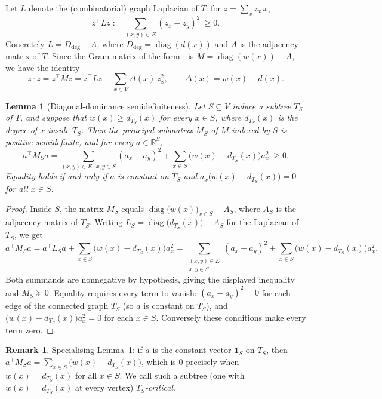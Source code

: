 \documentclass[11pt]{article}
\newcommand{\bR}{\mathbb{R}}
\newtheorem{lemma}{Lemma}
\theoremstyle{definition}
\newtheorem{remark}{Remark}
\begin{document}
Let $L$ denote the (combinatorial) graph Laplacian of $T$: for $z=\sum_x z_x\,x$,
\begin{equation}\label{eq:laplacian}
z^\top L z:=\sum_{(x,y)\in E}(z_x-z_y)^2\ \ge 0 .
\end{equation}
Concretely $L=D_{\deg}-A$, where $D_{\deg}=\operatorname{diag}(d(x))$ and $A$ is the
adjacency matrix of $T$. Since the Gram matrix of the form $\cdot$ is
$M=\operatorname{diag}(w(x))-A$, we have the identity
\begin{equation}\label{eq:Mdecomp}
z\cdot z=z^\top M z=z^\top L z+\sum_{x\in V}\Delta(x)\,z_x^2 ,
\qquad \Delta(x)=w(x)-d(x).
\end{equation}

\begin{lemma}[Diagonal-dominance semidefiniteness]\label{lem:psd}
Let $S\subseteq V$ induce a subtree $T_S$ of $T$, and suppose that
$w(x)\ge d_{T_S}(x)$ for every $x\in S$, where $d_{T_S}(x)$ is the degree of $x$
inside $T_S$. Then the principal submatrix $M_S$ of $M$ indexed by $S$ is positive
semidefinite, and for every $a\in\bR^{S}$,
\[
a^\top M_S a=\sum_{(x,y)\in E,\;x,y\in S}(a_x-a_y)^2+\sum_{x\in S}\bigl(w(x)-d_{T_S}(x)\bigr)a_x^2\ \ge 0 .
\]
Equality holds if and only if $a$ is constant on $T_S$ and $a_x\bigl(w(x)-d_{T_S}(x)\bigr)=0$ for all $x\in S$.
\end{lemma}

\begin{proof}
Inside $S$, the matrix $M_S$ equals $\operatorname{diag}\bigl(w(x)\bigr)_{x\in S}-A_S$,
where $A_S$ is the adjacency matrix of $T_S$. Writing
$L_S=\operatorname{diag}\bigl(d_{T_S}(x)\bigr)-A_S$ for the Laplacian of $T_S$, we get
\[
a^\top M_S a=a^\top L_S a+\sum_{x\in S}\bigl(w(x)-d_{T_S}(x)\bigr)a_x^2
=\sum_{\substack{(x,y)\in E\\ x,y\in S}}(a_x-a_y)^2+\sum_{x\in S}\bigl(w(x)-d_{T_S}(x)\bigr)a_x^2 .
\]
Both summands are nonnegative by hypothesis, giving the displayed inequality and
$M_S\succeq 0$. Equality requires every term to vanish: $(a_x-a_y)^2=0$ for each edge
of the connected graph $T_S$ (so $a$ is constant on $T_S$), and
$\bigl(w(x)-d_{T_S}(x)\bigr)a_x^2=0$ for each $x\in S$. Conversely these conditions
make every term zero.
\end{proof}

\begin{remark}\label{rem:critical}
Specialising Lemma~\ref{lem:psd}: if $a$ is the constant vector $\mathbf 1_S$ on $T_S$,
then $a^\top M_S a=\sum_{x\in S}\bigl(w(x)-d_{T_S}(x)\bigr)$, which is $0$ precisely when
$w(x)=d_{T_S}(x)$ for all $x\in S$. We call such a subtree (one with
$w(x)=d_{T_S}(x)$ at every vertex) \emph{$T_S$-critical}.
\end{remark}
\end{document}
